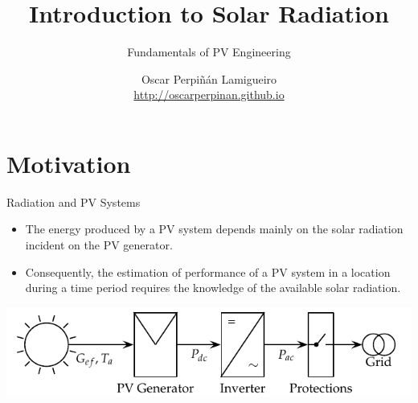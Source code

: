 \documentclass[xcolor={usenames,svgnames,dvipsnames}]{beamer}
\author{Oscar Perpiñán Lamigueiro \\ \url{http://oscarperpinan.github.io}}
\date{}
\title{Introduction to Solar Radiation}
\subtitle{Fundamentals of PV Engineering}
\begin{document}
\maketitle

\section{Motivation}
\label{sec:org9c78e8f}

\begin{frame}[label={sec:org8edacdc}]{Radiation and PV Systems}
\begin{itemize}
\item The energy produced by a PV system depends mainly on the solar radiation incident on the PV generator.

\item Consequently, the estimation of performance of a PV system in a location during a time period requires the knowledge of the available solar radiation.
\end{itemize}

\begin{center}
\includegraphics[width=.9\linewidth]{../figs/GCPVScheme.pdf}
\end{center}
\end{frame}
\end{document}
